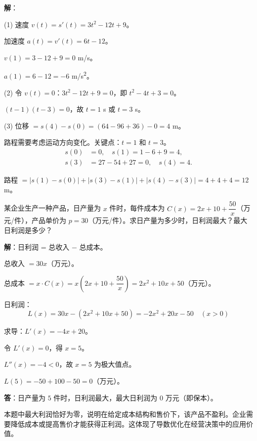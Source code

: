 \documentclass[12pt, a4paper]{ctexart}
\begin{document}
\textbf{解}：

(1) 速度 $v(t) = s'(t) = 3t^2 - 12t + 9$。

加速度 $a(t) = v'(t) = 6t - 12$。

$v(1) = 3 - 12 + 9 = 0$ m/s。

$a(1) = 6 - 12 = -6$ m/s\textsuperscript{2}。

(2) 令 $v(t) = 0$：$3t^2 - 12t + 9 = 0$，即 $t^2 - 4t + 3 = 0$。

$(t - 1)(t - 3) = 0$，故 $t = 1$ s 或 $t = 3$ s。

(3) 位移 $= s(4) - s(0) = (64 - 96 + 36) - 0 = 4$ m。

路程需要考虑运动方向变化。关键点：$t = 1$ 和 $t = 3$。
\begin{align*}
s(0) &= 0, \quad s(1) = 1 - 6 + 9 = 4, \\
s(3) &= 27 - 54 + 27 = 0, \quad s(4) = 4.
\end{align*}

路程 $= |s(1) - s(0)| + |s(3) - s(1)| + |s(4) - s(3)| = 4 + 4 + 4 = 12$ m。

\begin{appbox}[【应用3】利润最大化问题]
某企业生产一种产品，日产量为 $x$ 件时，每件成本为 $C(x) = 2x + 10 + \dfrac{50}{x}$（万元/件），产品单价为 $p = 30$（万元/件）。求日产量为多少时，日利润最大？最大日利润是多少？
\end{appbox}

\textbf{解}：日利润 = 总收入 $-$ 总成本。

总收入 $= 30x$（万元）。

总成本 $= x \cdot C(x) = x\left(2x + 10 + \dfrac{50}{x}\right) = 2x^2 + 10x + 50$（万元）。

日利润：
\[
L(x) = 30x - (2x^2 + 10x + 50) = -2x^2 + 20x - 50 \quad (x > 0)
\]

求导：$L'(x) = -4x + 20$。

令 $L'(x) = 0$，得 $x = 5$。

$L''(x) = -4 < 0$，故 $x = 5$ 为极大值点。

$L(5) = -50 + 100 - 50 = 0$（万元）。

\textbf{答}：日产量为 $5$ 件时，日利润最大，最大日利润为 $0$ 万元（即保本）。

\begin{warnbox}[注意]
本题中最大利润恰好为零，说明在给定成本结构和售价下，该产品不盈利。企业需要降低成本或提高售价才能获得正利润。这体现了导数优化在经营决策中的应用价值。
\end{warnbox}
\end{document}
